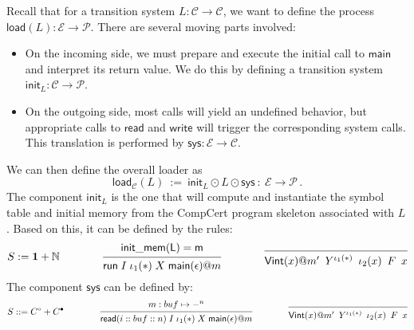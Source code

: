 \documentclass{report}
\begin{document}
Recall that for a transition system
$L : \mathcal{C} \rightarrow \mathcal{C}$,
we want to define the process
$\mathsf{load}(L) : \mathcal{E} \rightarrow \mathcal{P}$.
There are several moving parts involved:
\begin{itemize}
  \item On the incoming side,
    we must prepare and execute the initial call to $\mathsf{main}$
    and interpret its return value.
    We do this by defining a transition system
    $\mathsf{init}_L : \mathcal{C} \rightarrow \mathcal{P}$.
  \item On the outgoing side,
    most calls will yield an undefined behavior,
    but appropriate calls to $\mathsf{read}$ and $\mathsf{write}$
    will trigger the corresponding system calls.
    This translation is performed by
    $\mathsf{sys} : \mathcal{E} \rightarrow \mathcal{C}$.
\end{itemize}
We can then define the overall loader as
\[
  \mathsf{load}_\mathcal{C}(L) \: := \:
  \mathsf{init}_L \odot L \odot \mathsf{sys} \: : \:
  \mathcal{E} \rightarrow \mathcal{P}
  \,.
\]
The component $\mathsf{init}_L$ is the one that will
compute and instantiate the symbol table and initial memory
from the CompCert program skeleton associated with $L$.
Based on this, it can be defined by the rules:
\[
  S := \mathbf{1} + \mathbb{N}
  \qquad \qquad
  \begin{prooftree}
    \hypo{\mathsf{init\_mem(L) = m}}
    \infer1{
      \mathsf{run}
      \mathrel{I}
      \iota_1({*})
      \mathrel{X}
      \mathsf{main}(\epsilon) @ m
    }
  \end{prooftree}
  \qquad \qquad
  \begin{prooftree}
    \infer0{
      \mathsf{Vint}(x)@m'
      \: \mathrel{Y}^{\iota_1(*)} \:
      \iota_2(x)
      \: \mathrel{F} \:
      x}
  \end{prooftree}
\]
The component $\mathsf{sys}$ can be defined by:
\[
  S ::= C^\circ + C^\bullet
  \qquad \qquad
  \begin{prooftree}
    \hypo{m : buf \mapsto {-}^n}
    \infer1{
      \mathsf{read}(i :: buf :: n)
      \mathrel{I}
      \iota_1({*})
      \mathrel{X}
      \mathsf{main}(\epsilon) @ m
    }
  \end{prooftree}
  \qquad \qquad
  \begin{prooftree}
    \infer0{
      \mathsf{Vint}(x)@m'
      \: \mathrel{Y}^{\iota_1(*)} \:
      \iota_2(x)
      \: \mathrel{F} \:
      x}
  \end{prooftree}
\]
\end{document}
